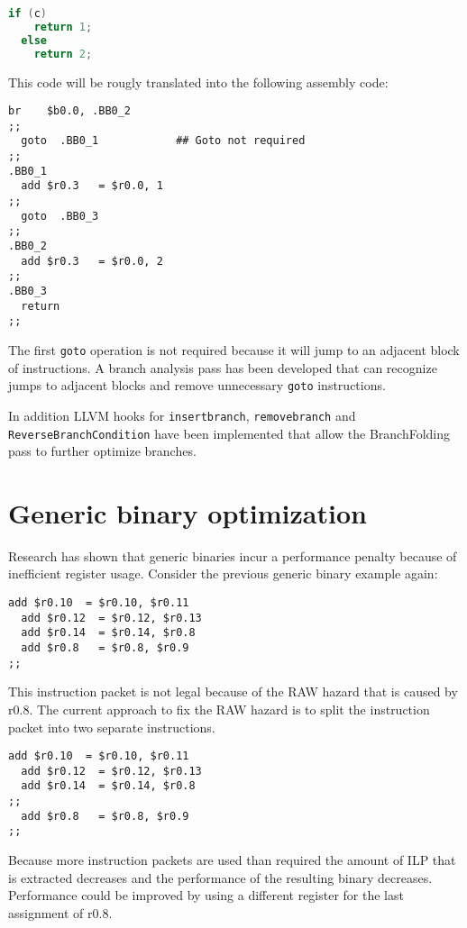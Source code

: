 \begin{lstlisting}[language=c]
  if (c)
    return 1;
  else
    return 2;
\end{lstlisting}

This code will be rougly translated into the following assembly code:

\begin{lstlisting}[language=rvex]
  br    $b0.0, .BB0_2
;;
  goto  .BB0_1            ## Goto not required
;;
.BB0_1
  add $r0.3   = $r0.0, 1
;;
  goto  .BB0_3
;;
.BB0_2
  add $r0.3   = $r0.0, 2
;;
.BB0_3
  return
;;
\end{lstlisting}

The first \texttt{goto} operation is not required because it will jump to an adjacent block of instructions. A branch analysis pass has been developed that can recognize jumps to adjacent blocks and remove unnecessary \texttt{goto} instructions.

In addition LLVM hooks for \texttt{insertbranch}, \texttt{removebranch} and \texttt{ ReverseBranchCondition} have been implemented that allow the BranchFolding pass to further optimize branches.


\section{Generic binary optimization}
Research has shown \cite{Anthony-Brandon:2013jk} that generic binaries incur a performance penalty because of inefficient register usage. Consider the previous generic binary example again:

\begin{lstlisting}[language=rvex]
  add $r0.10  = $r0.10, $r0.11
  add $r0.12  = $r0.12, $r0.13
  add $r0.14  = $r0.14, $r0.8
  add $r0.8   = $r0.8, $r0.9
;;
\end{lstlisting}

This instruction packet is not legal because of the RAW hazard that is caused by r0.8. The current approach to fix the RAW hazard is to split the instruction packet into two separate instructions. 

\begin{lstlisting}[language=rvex]
  add $r0.10  = $r0.10, $r0.11
  add $r0.12  = $r0.12, $r0.13
  add $r0.14  = $r0.14, $r0.8
;;
  add $r0.8   = $r0.8, $r0.9
;;
\end{lstlisting}

Because more instruction packets are used than required the amount of ILP that is extracted decreases and the performance of the resulting binary decreases. Performance could be improved by using a different register for the last assignment of r0.8. 

